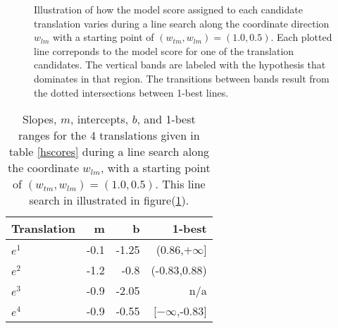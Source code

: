 \documentclass[11pt,tightenlines,kern-1pt]{article}
\begin{document}
\begin{figure}[h]
\begin{center}
\setlength{\epsfxsize}{3.0in}
\centerline{}
\vskip -0.15in
\caption{Illustration of how the model score assigned to each candidate translation varies during a line search along the coordinate direction \mbox{$w_{lm}$} with a starting point of \mbox{$(w_{tm}, w_{lm}) = (1.0, 0.5)$}. 
Each plotted line correponds to the model score for one of the translation candidates. The vertical bands are labeled with the hypothesis that dominates in that region. The transitions between bands result from the dotted intersections between 1-best lines.
\label{mertlinesearch}
}
\end{center}
\vskip -0.2in
\end{figure}

\begin{table}
\begin{center}
\begin{tabular}{|l|rrr|}
\hline \bf Translation  & \bf m  & \bf b & \bf 1-best  \\
\hline
\mbox{$e^1$}     & -0.1 & -1.25  & (0.86,\mbox{$+\infty$}] \\
\mbox{$e^2$}     & -1.2 & -0.8   & (-0.83,0.88) \\
\mbox{$e^3$}     & -0.9 & -2.05  & n/a \\
\mbox{$e^4$}     & -0.9 & -0.55  & [\mbox{$-\infty$},-0.83] \\
\hline
\end{tabular}
\end{center}
\caption{Slopes, \mbox{$m$}, intercepts, \mbox{$b$}, and 1-best ranges for the 4 translations given in table \ref{hscores} during a line search along the coordinate \mbox{$w_{lm}$}, with a starting point of \mbox{$(w_{tm}, w_{lm}) = (1.0, 0.5)$}. This line search in illustrated in figure(\ref{mertlinesearch}).
\label{hlinesearch}
}
\end{table}
\end{document}
